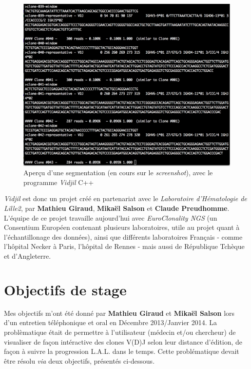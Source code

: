 \documentclass[pdftex,12pt,a4paper]{report}
\begin{document}
\begin{spacing}{1.2}
\begin{figure}[H]
\begin{center}
	\includegraphics[scale=0.6]{img/C++-Ex.jpg}
\end{center}
\caption{Aperçu d'une segmentation (en cours sur le \textit{screenshot}), avec le programme \textit{Vidjil} C++}
\end{figure}

\textit{Vidjil} est donc un projet créé en partenariat avec le \textit{Laboratoire d'Hématologie de Lille2}, par \textbf{Mathieu Giraud}, \textbf{Mikaël Salson} et \textbf{Claude Preudhomme}.
L'équipe de ce projet travaille aujourd'hui avec \textit{EuroClonality NGS} (un Consentium Européen contenant plusieurs laboratoires, utile au projet quant à l'échantillonage des données), ainsi que différents laboratoires Français - comme l'hôpital Necker à Paris, l'hôpital de Rennes - mais aussi de République Tchèque et d'Angleterre.

\section{Objectifs de stage}
Mes objectifs m'ont été donné par \textbf{Mathieu Giraud} et \textbf{Mikaël Salson} lors d'un entretien téléphonique et oral en Décembre 2013/Janvier 2014.
\newline
La problèmatique était de permettre à l'utilisateur (médecin et/ou chercheur) de visualiser de façon intéractive des clones V(D)J selon leur distance d'édition, de façon à suivre la progression L.A.L. dans le temps.
\newline
Cette problématique devait être résolu \textit{via} deux objectifs, présentés ci-dessous. 


\end{spacing}
\end{document}
